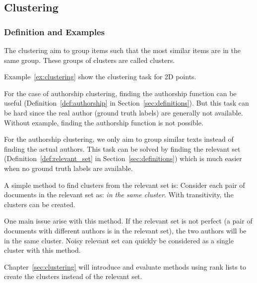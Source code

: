\subsection{Clustering}

\subsubsection{Definition and Examples}

The clustering aim to group items such that the most similar items are in the same group.
These groups of clusters are called clusters.

Example~\ref{ex:clustering} show the clustering task for 2D points.

For the case of authorship clustering, finding the authorship function can be useful (Definition~\ref{def:authorship} in Section~\ref{sec:definitions}).
But this task can be hard since the real author (ground truth labels) are generally not available.
Without example, finding the authorship function is not possible.

For the authorship clustering, we only aim to group similar texts instead of finding the actual authors.
This task can be solved by finding the relevant set (Definition~\ref{def:relevant_set} in Section~\ref{sec:definitions}) which is much easier when no ground truth labels are available.

A simple method to find clusters from the relevant set is:
Consider each pair of documents in the relevant set as: \textit{in the same cluster}.
With transitivity, the clusters can be created.

One main issue arise with this method.
If the relevant set is not perfect (a pair of documents with different authors is in the relevant set), the two authors will be in the same cluster.
Noisy relevant set can quickly be considered as a single cluster with this method.

Chapter~\ref{sec:clustering} will introduce and evaluate methods using rank lists to create the clusters instead of the relevant set.

